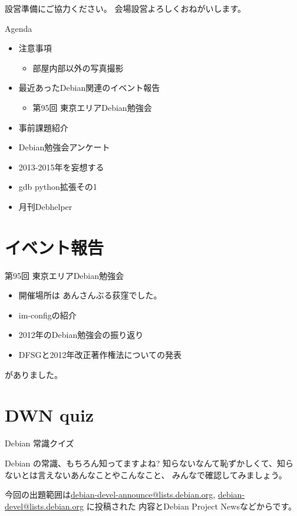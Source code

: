 \frame{\titlepage{}}

\begin{frame}{設営準備にご協力ください。}
会場設営よろしくおねがいします。
\end{frame}

\begin{frame}{Agenda}
\begin{minipage}[t]{0.45\hsize}
  \begin{itemize}
  \item 注意事項
	\begin{itemize}
	 \item 部屋内部以外の写真撮影
	\end{itemize}
   \item 最近あったDebian関連のイベント報告
	\begin{itemize}
        \item 第95回 東京エリアDebian勉強会
	\end{itemize}
   \item 事前課題紹介
 \end{itemize}
\end{minipage} 
\begin{minipage}[t]{0.45\hsize}
 \begin{itemize}
  \item Debian勉強会アンケート
  \item 2013-2015年を妄想する
  \item gdb python拡張その1
  \item 月刊Debhelper
 \end{itemize}
\end{minipage}
\end{frame}


\section{イベント報告}
\begin{frame}{第95回 東京エリアDebian勉強会}
\begin{itemize}
\item 開催場所は あんさんぶる荻窪でした。
\item im-configの紹介
\item 2012年のDebian勉強会の振り返り
\item DFSGと2012年改正著作権法についての発表
\end{itemize}
がありました。
\end{frame}

\section{DWN quiz}
\begin{frame}{Debian 常識クイズ}

Debian の常識、もちろん知ってますよね?
知らないなんて恥ずかしくて、知らないとは言えないあんなことやこんなこと、
みんなで確認してみましょう。

今回の出題範囲は\url{debian-devel-announce@lists.debian.org},
\url{debian-devel@lists.debian.org} に投稿された
内容とDebian Project Newsなどからです。

\end{frame}

